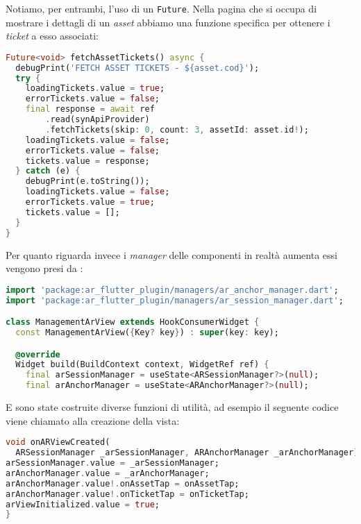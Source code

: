 Notiamo, per entrambi, l'uso di un \verb+Future+. Nella pagina che si occupa di mostrare i dettagli di un \textit{asset} abbiamo una funzione specifica per ottenere i \textit{ticket} a esso associati:

\begin{lstlisting}[language=dart, label={lst:mobilesyn_asset_ticket_provider}, firstnumber=1,caption={mobilesyn \textit{asset ticket provider}}]
Future<void> fetchAssetTickets() async {
  debugPrint('FETCH ASSET TICKETS - ${asset.cod}');
  try {
    loadingTickets.value = true;
    errorTickets.value = false;
    final response = await ref
        .read(synApiProvider)
        .fetchTickets(skip: 0, count: 3, assetId: asset.id!);
    loadingTickets.value = false;
    errorTickets.value = false;
    tickets.value = response;
  } catch (e) {
    debugPrint(e.toString());
    loadingTickets.value = false;
    errorTickets.value = true;
    tickets.value = [];
  }
}
\end{lstlisting} 



Per quanto riguarda invece i \textit{manager} delle componenti in realtà aumenta essi vengono presi da \aplug{}:

\begin{lstlisting}[language=dart, label={lst:mobilesyn_managers}, firstnumber=1,caption={mobilesyn \textit{managers}}]
import 'package:ar_flutter_plugin/managers/ar_anchor_manager.dart';
import 'package:ar_flutter_plugin/managers/ar_session_manager.dart';

class ManagementArView extends HookConsumerWidget {
  const ManagementArView({Key? key}) : super(key: key);

  @override
  Widget build(BuildContext context, WidgetRef ref) {
    final arSessionManager = useState<ARSessionManager?>(null);
    final arAnchorManager = useState<ARAnchorManager?>(null);
\end{lstlisting} 

E sono state costruite diverse funzioni di utilità, ad esempio il seguente codice viene chiamato alla creazione della vista:

\begin{lstlisting}[language=dart, label={lst:mobilesyn_onARViewCreated}, firstnumber=1,caption={mobilesyn \textit{on ar view created}}]
void onARViewCreated(
  ARSessionManager _arSessionManager, ARAnchorManager _arAnchorManager) {
arSessionManager.value = _arSessionManager;
arAnchorManager.value = _arAnchorManager;
arAnchorManager.value!.onAssetTap = onAssetTap;
arAnchorManager.value!.onTicketTap = onTicketTap;
arViewInitialized.value = true;
}
\end{lstlisting} 

